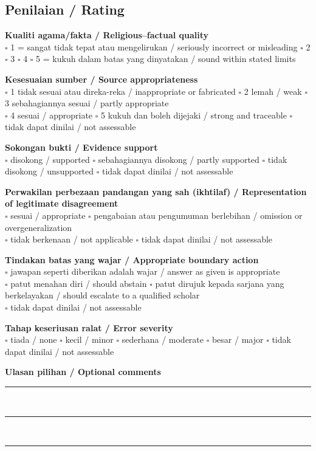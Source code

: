 \documentclass[11pt,a4paper]{article}
\begin{document}
\subsection*{Penilaian / Rating}
\textbf{Kualiti agama/fakta / Religious--factual quality}\\
$\square$ 1 = sangat tidak tepat atau mengelirukan / seriously incorrect or misleading \quad
$\square$ 2 \quad $\square$ 3 \quad $\square$ 4 \quad
$\square$ 5 = kukuh dalam batas yang dinyatakan / sound within stated limits

\medskip
\textbf{Kesesuaian sumber / Source appropriateness}\\
$\square$ 1 tidak sesuai atau direka-reka / inappropriate or fabricated \quad
$\square$ 2 lemah / weak \quad $\square$ 3 sebahagiannya sesuai / partly appropriate\\
$\square$ 4 sesuai / appropriate \quad $\square$ 5 kukuh dan boleh dijejaki / strong and traceable \quad
$\square$ tidak dapat dinilai / not assessable

\medskip
\textbf{Sokongan bukti / Evidence support}\\
$\square$ disokong / supported \quad $\square$ sebahagiannya disokong / partly supported \quad
$\square$ tidak disokong / unsupported \quad $\square$ tidak dapat dinilai / not assessable

\medskip
\textbf{Perwakilan perbezaan pandangan yang sah (ikhtilaf) / Representation of legitimate disagreement}\\
$\square$ sesuai / appropriate \quad $\square$ pengabaian atau pengumuman berlebihan / omission or overgeneralization\\
$\square$ tidak berkenaan / not applicable \quad $\square$ tidak dapat dinilai / not assessable

\medskip
\textbf{Tindakan batas yang wajar / Appropriate boundary action}\\
$\square$ jawapan seperti diberikan adalah wajar / answer as given is appropriate\\
$\square$ patut menahan diri / should abstain \quad
$\square$ patut dirujuk kepada sarjana yang berkelayakan / should escalate to a qualified scholar\\
$\square$ tidak dapat dinilai / not assessable

\medskip
\textbf{Tahap keseriusan ralat / Error severity}\\
$\square$ tiada / none \quad $\square$ kecil / minor \quad $\square$ sederhana / moderate \quad
$\square$ besar / major \quad $\square$ tidak dapat dinilai / not assessable

\medskip
\textbf{Ulasan pilihan / Optional comments}\\[3pt]
\rule{\textwidth}{0.4pt}\\[16pt]
\rule{\textwidth}{0.4pt}\\[16pt]
\rule{\textwidth}{0.4pt}
\end{document}
